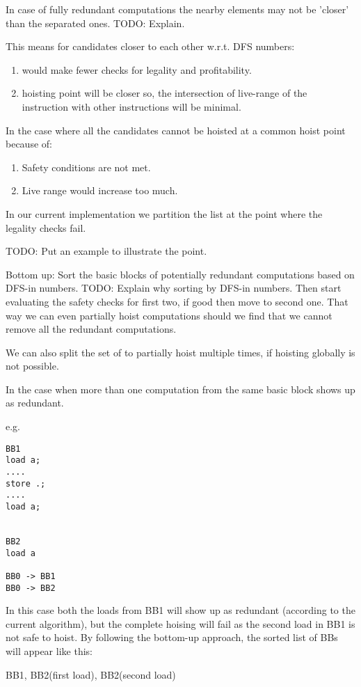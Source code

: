 \documentclass{sig-alternate}
\begin{document}
In case of fully redundant computations the nearby elements may not be 'closer'
than the separated ones. TODO: Explain.

This means for candidates closer to each other w.r.t. DFS numbers:
\begin{enumerate}
\item would make fewer checks for legality and profitability.
\item hoisting point will be closer so, the intersection of live-range of the
  instruction with other instructions will be minimal.
\end{enumerate}


In the case where all the candidates cannot be hoisted at a common hoist point
because of:
\begin{enumerate}
\item Safety conditions are not met.
\item Live range would increase too much.
\end{enumerate}

In our current implementation we partition the list at the point where the
legality checks fail.

TODO: Put an example to illustrate the point.

Bottom up: Sort the basic blocks of potentially redundant computations
based on DFS-in numbers.  TODO: Explain why sorting by DFS-in numbers.
Then start evaluating the safety checks for first two, if good then
move to second one. That way we can even partially hoist computations
should we find that we cannot remove all the redundant computations.

We can also split the set of to partially hoist multiple times, if
hoisting globally is not possible.

In the case when more than one computation from the same basic block
shows up as redundant.

e.g.
\begin{verbatim}
BB1
load a;
....
store .;
....
load a;


BB2
load a

BB0 -> BB1
BB0 -> BB2
\end{verbatim}

In this case both the loads from BB1 will show up as redundant
(according to the current algorithm), but the complete hoising will
fail as the second load in BB1 is not safe to hoist. By following the
bottom-up approach, the sorted list of BBs will appear like this:

{ BB1, BB2(first load), BB2(second load) }
\end{document}
